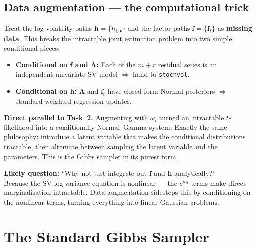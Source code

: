 \documentclass[11pt, a4paper]{article}\usepackage[]{graphicx}\usepackage[]{xcolor}
\newcommand{\stress}[1]{\textbf{#1}}
\begin{document}
\subsection{Data augmentation --- the computational trick}

Treat the log-volatility paths $\mathbf{h} = \{h_{i,\bullet}\}$ and the
factor paths $\mathbf{f} = \{\mathbf{f}_t\}$ as \stress{missing data}.  This
breaks the intractable joint estimation problem into two simple conditional
pieces:

\begin{itemize}[itemsep=4pt]
  \item \textbf{Conditional on $\mathbf{f}$ and $\boldsymbol{\Lambda}$:}
        Each of the $m+r$ residual series is an independent univariate SV
        model $\Rightarrow$ hand to \texttt{stochvol}.
  \item \textbf{Conditional on $\mathbf{h}$:}
        $\boldsymbol{\Lambda}$ and $\mathbf{f}_t$ have closed-form Normal
        posteriors $\Rightarrow$ standard weighted regression updates.
\end{itemize}

\begin{remarkbox}
  \textbf{Direct parallel to Task~2.}  Augmenting with $\omega_i$ turned an
  intractable $t$-likelihood into a conditionally Normal--Gamma system.
  Exactly the same philosophy: introduce a latent variable that makes the
  conditional distributions tractable, then alternate between sampling the
  latent variable and the parameters.  This is the Gibbs sampler in its
  purest form.
\end{remarkbox}

\begin{remarkbox}
  \textbf{Likely question:} ``Why not just integrate out $\mathbf{f}$ and
  $\mathbf{h}$ analytically?''\\
  Because the SV log-variance equation is nonlinear --- the
  $e^{h_{it}}$ terms make direct marginalisation intractable.  Data
  augmentation sidesteps this by conditioning on the nonlinear terms,
  turning everything into linear Gaussian problems.
\end{remarkbox}

\section{The Standard Gibbs Sampler}
\end{document}
